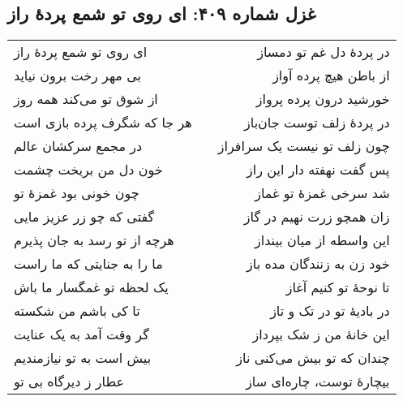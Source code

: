 \begin{center}
\section*{غزل شماره ۴۰۹: ای روی تو شمع پردهٔ راز}
\label{sec:409}
\begin{longtable}{l p{0.5cm} r}
ای روی تو شمع پردهٔ راز
&&
در پردهٔ دل غم تو دمساز
\\
بی مهر رخت برون نیاید
&&
از باطن هیچ پرده آواز
\\
از شوق تو می‌کند همه روز
&&
خورشید درون پرده پرواز
\\
هر جا که شگرف پرده بازی است
&&
در پردهٔ زلف توست جان‌باز
\\
در مجمع سرکشان عالم
&&
چون زلف تو نیست یک سرافراز
\\
خون دل من بریخت چشمت
&&
پس گفت نهفته دار این راز
\\
چون خونی بود غمزهٔ تو
&&
شد سرخی غمزهٔ تو غماز
\\
گفتی که چو زر عزیز مایی
&&
زان همچو زرت نهیم در گاز
\\
هرچه از تو رسد به جان پذیرم
&&
این واسطه از میان بینداز
\\
ما را به جنایتی که ما راست
&&
خود زن به زنندگان مده باز
\\
یک لحظه تو غمگسار ما باش
&&
تا نوحهٔ تو کنیم آغاز
\\
تا کی باشم من شکسته
&&
در بادیهٔ تو در تک و تاز
\\
گر وقت آمد به یک عنایت
&&
این خانهٔ من ز شک بپرداز
\\
بیش است به تو نیازمندیم
&&
چندان که تو بیش می‌کنی ناز
\\
عطار ز دیرگاه بی تو
&&
بیچارهٔ توست، چاره‌ای ساز
\\
\end{longtable}
\end{center}
